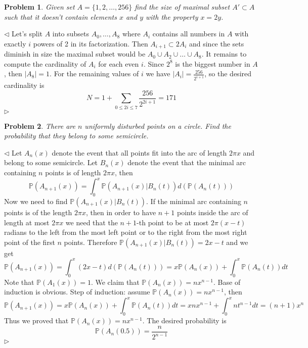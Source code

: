 \documentclass[12pt]{article}
\newtheorem{problem}{Problem}[subsection]
\newenvironment{solution}{\par $\triangleleft$}{$\triangleright$}
\begin{document}
\begin{problem} Given set $A=\{1,2,\ldots,256\}$ find the size of maximal subset
$A'\subset A$ such that it doesn't contain elements $x$ and $y$ with the
property $x=2y$.
\end{problem}
\begin{solution} Let's split $A$ into subsets $A_0,\ldots,A_8$ where $A_i$
    contains all numbers in $A$ with exactly $i$ powers of 2 in its
    factorization. Then $A_{i+1} \subset 2A_i$ and since the sets diminish in
    size the maximal subset would be $A_0\cup A_2\cup\ldots\cup A_8$. It remains
    to compute the cardinality of $A_i$ for each even $i$. Since $2^8$ is the
    biggest number in $A$, then $|A_8|=1$. For the remaining values of $i$ we
    have $|A_i|=\frac{256}{2^{i+1}}$, so the desired cardinality is
    $$
        N=1+\sum\limits_{0\leq 2i\leq 7}\frac{256}{2^{2i+1}}=171
    $$
\end{solution}

\begin{problem} There are $n$ uniformly disturbed points on a circle. Find the
probability that they belong to some semicircle.
\end{problem}
\begin{solution} Let $A_n(x)$ denote the event that all points fit into the arc
    of length $2\pi x$ and belong to some semicircle. Let $B_n(x)$ denote the
    event that the minimal arc containing $n$ points is of length $2\pi x$, then
    $$
        \mathbb{P}(A_{n+1}(x))=
        \int_0^x \mathbb{P}(A_{n+1}(x)|B_n(t)) d(\mathbb{P}(A_n(t)))
    $$
    Now we need to find $\mathbb{P}(A_{n+1}(x)|B_n(t))$. If the minimal arc
    containing $n$ points is of the length $2\pi x$, then in order to have $n+1$
    points inside the arc of length at most $2\pi x$ we need that the $n+1$-th
    point to be at most $2\pi(x-t)$ radians to the left from the most left point
    or to the right from the most right point of the first $n$ points. Therefore
    $\mathbb{P}(A_{n+1}(x)|B_n(t))=2x-t$ and we get
    $$
        \mathbb{P}(A_{n+1}(x))=\int_0^x (2x-t) d(\mathbb{P}(A_n(t)))
        =x\mathbb{P}(A_n(x))+\int_0^x \mathbb{P}(A_n(t))dt
    $$
    Note that $\mathbb{P}(A_1(x))=1$. We claim that $\mathbb{P}(A_n(x))=n
        x^{n-1}$. Base of induction is obvious. Step of induction: assume
    $\mathbb{P}(A_n(x))=n x^{n-1}$, then
    $$
        \mathbb{P}(A_{n+1}(x))
        =x\mathbb{P}(A_n(x))+\int_0^x \mathbb{P}(A_n(t))dt
        =xn x^{n-1}+\int_0^x n t^{n-1}dt
        =(n+1)x^n
    $$
    Thus we proved that $\mathbb{P}(A_n(x))=n x^{n-1}$. The desired probability
    is
    $$
        \mathbb{P}(A_n(0.5))=\frac{n}{2^{n-1}}
    $$
\end{solution}
\end{document}
